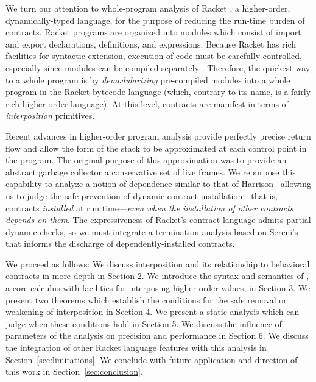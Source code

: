 We turn our attention to whole-program analysis of Racket \cite{plt-tr1}, a higher-order, dynamically-typed language, for the purpose of reducing the run-time burden of contracts.
Racket programs are organized into modules which consist of import and export declarations, definitions, and expressions.
Because Racket has rich facilities for syntactic extension, execution of code must be carefully controlled, especially since modules can be compiled separately \cite{flatt2002composable}.
Therefore, the quickest way to a whole program is by \emph{demodularizing} pre-compiled modules into a whole program in the Racket bytecode language (which, contrary to its name, is a fairly rich higher-order language).
At this level, contracts are manifest in terms of \emph{interposition} primitives.

Recent advances in higher-order program analysis \cite{earl2012introspective} provide perfectly precise return flow and allow the form of the stack to be approximated at each control point in the program.
The original purpose of this approximation was to provide an abstract garbage collector a conservative set of live frames.
We repurpose this capability to analyze a notion of dependence similar to that of Harrison~\cite{harrison1989interprocedural} allowing us to judge the safe prevention of dynamic contract installation---that is, contracts \emph{installed} at run time---\emph{even when the installation of other contracts depends on them}.
The expressiveness of Racket's contract language admits partial dynamic checks, so we must integrate a termination analysis based on Sereni's~\cite{sereni2007termination} that informs the discharge of dependently-installed contracts.

We proceed as follows:
We discuss interposition and its relationship to behavioral contracts in more depth in Section 2.
We introduce the syntax and semantics of \chapcalc, a core calculus with facilities for interposing higher-order values, in Section 3.
We present two theorems which establish the conditions for the safe removal or weakening of interposition in Section 4.
We present a static analysis which can judge when these conditions hold in Section 5.
We discuss the influence of parameters of the analysis on precision and performance in Section 6.
We discuss the integration of other Racket language features with this analysis in Section~\ref{sec:limitations}.
We conclude with future application and direction of this work in Section~\ref{sec:conclusion}.
